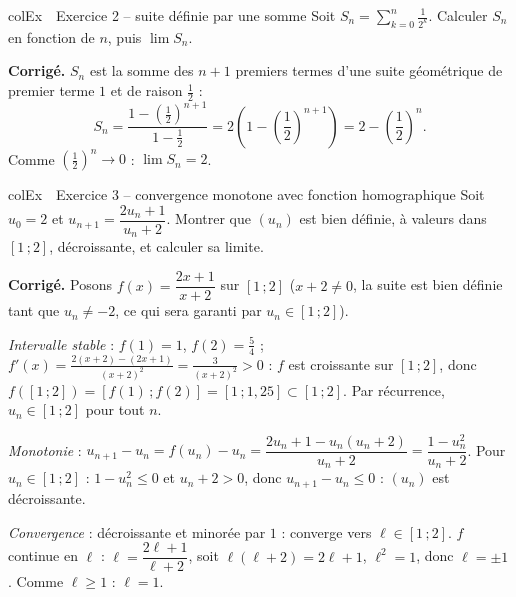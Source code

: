 \documentclass[11pt,a4paper]{article}
\newenvironment{exemple}[1][Exemple]
  {\begin{fiche}{colEx}{\ding{217}~~#1}}{\end{fiche}}
\begin{document}
\begin{exemple}[Exercice 2 -- suite définie par une somme]
Soit $S_n = \displaystyle\sum_{k=0}^{n} \frac{1}{2^k}$. Calculer $S_n$ en fonction de $n$, puis $\lim S_n$.

\smallskip
\textbf{Corrigé.} $S_n$ est la somme des $n+1$ premiers termes d'une suite géométrique de premier terme $1$ et de raison $\frac{1}{2}$ :
\[
  S_n = \frac{1 - \left(\frac{1}{2}\right)^{n+1}}{1 - \frac{1}{2}} = 2\left(1 - \left(\frac{1}{2}\right)^{n+1}\right) = 2 - \left(\frac{1}{2}\right)^n.
\]
Comme $\left(\frac{1}{2}\right)^n \to 0$ : $\lim S_n = 2$.
\end{exemple}

\begin{exemple}[Exercice 3 -- convergence monotone avec fonction homographique]
Soit $u_0 = 2$ et $u_{n+1} = \dfrac{2u_n + 1}{u_n + 2}$. Montrer que $(u_n)$ est bien définie, à valeurs dans $[1\,;2]$, décroissante, et calculer sa limite.

\smallskip
\textbf{Corrigé.} Posons $f(x) = \dfrac{2x+1}{x+2}$ sur $[1\,;2]$ ($x + 2 \neq 0$, la suite est bien définie tant que $u_n \neq -2$, ce qui sera garanti par $u_n \in [1\,;2]$).

\smallskip
\emph{Intervalle stable} : $f(1) = 1$, $f(2) = \frac{5}{4}$ ; $f'(x) = \frac{2(x+2)-(2x+1)}{(x+2)^2} = \frac{3}{(x+2)^2} > 0$ : $f$ est croissante sur $[1\,;2]$, donc $f([1\,;2]) = [f(1)\,;f(2)] = [1\,;1{,}25] \subset [1\,;2]$. Par récurrence, $u_n \in [1\,;2]$ pour tout $n$.

\smallskip
\emph{Monotonie} : $u_{n+1} - u_n = f(u_n) - u_n = \dfrac{2u_n+1 - u_n(u_n+2)}{u_n+2} = \dfrac{1 - u_n^2}{u_n+2}$. Pour $u_n \in [1\,;2]$ : $1 - u_n^2 \leq 0$ et $u_n + 2 > 0$, donc $u_{n+1} - u_n \leq 0$ : $(u_n)$ est décroissante.

\smallskip
\emph{Convergence} : décroissante et minorée par $1$ : converge vers $\ell \in [1\,;2]$. $f$ continue en $\ell$ : $\ell = \dfrac{2\ell+1}{\ell+2}$, soit $\ell(\ell+2) = 2\ell+1$, $\ell^2 = 1$, donc $\ell = \pm 1$. Comme $\ell \geq 1$ : $\boxed{\ell = 1}$.
\end{exemple}
\end{document}
